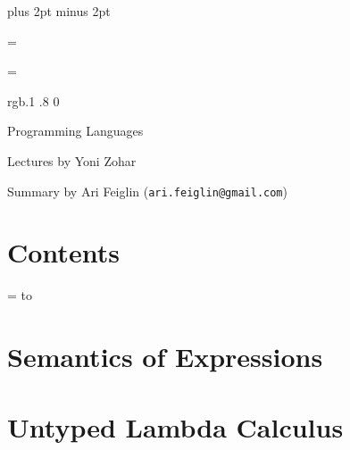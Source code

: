 


\parindent=0pt
\parskip=3pt plus 2pt minus 2pt



\footline={}


\headline={}

\color rgb{.1 .8 0}

{\def\boxshadowcolor{rgb{.2 .9 .2}}

    \centerline{Programming Languages}
    \smallskip
    \centerline{Lectures by Yoni Zohar}
    \centerline{Summary by Ari Feiglin ({\tt ari.feiglin@gmail.com})}

\eppbox

\bigskip

\section*{Contents}

\tableofcontents
\eppbox

}

\vfill\break

\color{black}

\newif\ifpageodd
\pageoddtrue
\headline={%
    \hbox to \hsize{\color{black}%
        \ifpageodd\hfil{\it\currsubsection\quad\bf\folio}\global\pageoddfalse%
        \else{\bf\folio\quad\it\currsubsection}\hfil\global\pageoddtrue\fi%
    }%
}

\section{Semantics of Expressions}



\vfill\break

\section{Untyped Lambda Calculus}



\bye

